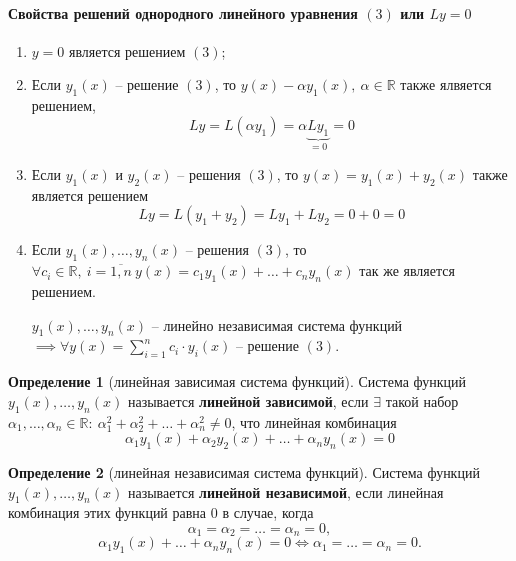 \documentclass{report}
\theoremstyle{definition}
\newtheorem{definition}{Определение}[section]
\begin{document}
\paragraph*{Свойства решений однородного линейного уравнения $(3)$ или $Ly = 0$}

\begin{enumerate}
    \item $y = 0$ является решением $(3)$;
    \item Если $y_1(x)$ -- решение $(3)$, то $y(x) - \alpha y_1(x), \ \alpha \in \mathbb{R}$ также ялвяется решением,
          \begin{equation*}
              Ly = L(\alpha y_1) = \alpha \underbrace{Ly_1}_{=0} = 0
          \end{equation*}
    \item Если $y_1(x)$ и $y_2(x)$ -- решения $(3)$, то $y(x) = y_1(x) + y_2(x)$ также является решением
          \begin{equation*}
              Ly = L(y_1 + y_2) = Ly_1 + Ly_2 = 0 + 0 = 0
          \end{equation*}
    \item Если $y_1(x), \ldots, y_n(x)$ -- решения $(3)$, то $\forall c_i \in \mathbb{R}, \ i =\overline{1,n} \ y(x) = c_1 y_1(x) + \ldots + c_n y_n(x)$ так же является решением.

          $y_1(x), \ldots, y_n(x)$ -- линейно независимая система функций $\implies \forall y(x) = \sum_{i = 1}^{n} c_i \cdot y_i(x)$ -- решение $(3)$.
\end{enumerate}

\begin{definition}[линейная зависимая система функций]
    Система функций $y_1(x), \ldots, y_n(x)$ называется \textbf{линейной зависимой}, если $\exists$ такой набор $\alpha_1,\ldots,\alpha_n \in \mathbb{R}: \ \alpha_1^2 + \alpha_2^2 + \ldots + \alpha_n^2 \ne 0$, что линейная комбинация
    \begin{equation*}
        \alpha_1y_1(x) + \alpha_2y_2(x) + \ldots + \alpha_ny_n(x) = 0
    \end{equation*}
\end{definition}

\begin{definition}[линейная независимая система функций]
    Система функций $y_1(x),\ldots,y_n(x)$ называется \textbf{линейной независимой}, если линейная комбинация этих функций равна $0$ в случае, когда
    \begin{equation*}
        \alpha_1 = \alpha_2 = \ldots = \alpha_n = 0,
    \end{equation*}
    \begin{equation*}
        \alpha_1y_1(x) + \ldots + \alpha_ny_n(x) = 0 \iff \alpha_1 = \ldots = \alpha_n = 0.
    \end{equation*}
\end{definition}
\end{document}
